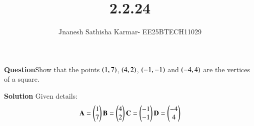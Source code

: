\documentclass[journal]{IEEEtran}
\theoremstyle{remark}
\begin{document}
\setlength{\abovedisplayskip}{0pt}
\setlength{\belowdisplayskip}{0pt}
\setlength{\abovedisplayshortskip}{0pt}
\setlength{\belowdisplayshortskip}{0pt}

\onecolumn

\title{2.2.24}
\author{Jnanesh Sathisha Karmar- EE25BTECH11029}
\maketitle


\renewcommand{\thefigure}{\theenumi}
\renewcommand{\thetable}{\theenumi}
\textbf{Question}Show that the points $\left(1, 7\right)$, $\left(4, 2\right)$, $\left(-1, -1\right)$ and $\left(-4, 4\right)$ are the vertices of a square.

\textbf{Solution}
Given details:
\begin{align}
    \mathbf{A}=\begin{pmatrix}1\\7\end{pmatrix}  \mathbf{B}=\begin{pmatrix}4\\2\end{pmatrix} \mathbf{C}=\begin{pmatrix}-1\\-1\end{pmatrix} \mathbf{D}=\begin{pmatrix}-4\\4\end{pmatrix}
\end{align}
\end{document}
